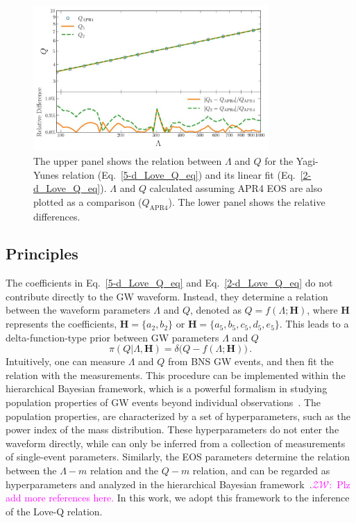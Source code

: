 \documentclass[a4paper,11pt]{article}
\newcommand{\ZW}[1]{\textcolor{magenta}{$\mathcal{ZW}$:~#1}}
\begin{document}
\begin{figure}[tbp]
\centering
\includegraphics[width=0.8\textwidth]{2d-5d difference.pdf}%
\caption{\label{relative_difference} The upper panel shows the relation between 
$\Lambda$ and $Q$ for the Yagi-Yunes relation (Eq.~\eqref{5-d_Love_Q_eq}) and its 
linear fit (Eq.~\eqref{2-d_Love_Q_eq}). $\Lambda$ and $Q$ calculated assuming APR4 
EOS are also plotted as a comparison ($Q_{\mathrm{APR4}}$). The lower panel shows 
the relative differences.}
\end{figure}

\subsection{Principles}
\label{subsec:framework_principles}

The coefficients in Eq.~\eqref{5-d_Love_Q_eq} and Eq.~\eqref{2-d_Love_Q_eq} 
do not contribute directly to the GW waveform. Instead, they 
determine a relation between the waveform parameters
$\Lambda$ and $Q$, denoted as $Q=f(\Lambda;\bm{H})$, where $\bm{H}$ represents
the coefficients, $\bm{H} = \{a_2, b_2\}$ or $\bm{H} = \{a_5, b_5, c_5, d_5,
e_5\}$.
This leads to a delta-function-type prior between GW parameters $\Lambda$ and $Q$
\begin{equation}
\label{delta function prior}
\pi(Q|\Lambda,\bm{H}) = \delta\big(Q-f(\Lambda;\bm{H})\big)\,.
\end{equation}
Intuitively, one can measure $\Lambda$ and $Q$ from BNS GW events, and then fit
the relation with the measurements. This procedure can be implemented within the
hierarchical Bayesian framework, which is a powerful formalism in studying population
properties of GW events beyond individual observations~\cite{Thrane_2019}. The
population properties, 
are characterized by a set of hyperparameters, such as the power index of the
mass distribution. These hyperparameters do not enter the waveform directly,
while can only be inferred from a collection of measurements of single-event
parameters. Similarly, the EOS parameters determine the relation between the
$\Lambda-m$ relation and the $Q-m$ relation, and can be regarded as
hyperparameters and analyzed in the hierarchical Bayesian
framework~\cite{Lackey:2014fwa}.\ZW{Plz add more references here.} In this work,
we adopt this framework to the inference of the Love-Q relation.
\end{document}
